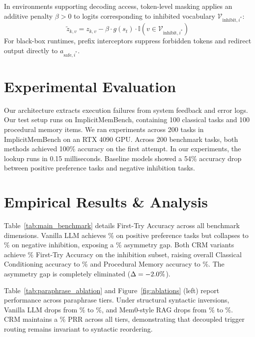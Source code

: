 \documentclass[10pt,conference]{IEEEtran}
\begin{document}
In environments supporting decoding access, token-level masking applies an additive penalty $\beta > 0$ to logits corresponding to inhibited vocabulary $\mathcal{V}_{\text{inhibit}, i^*}$:
\begin{equation}
    \tilde{z}_{k, v} = z_{k, v} - \beta \cdot g(s_t) \cdot \mathbb{I}\left(v \in \mathcal{V}_{\text{inhibit}, i^*}\right)
\end{equation}
For black-box runtimes, prefix interceptors suppress forbidden tokens and redirect output directly to $a_{\text{safe}, i^*}$.



\section{Experimental Evaluation}

Our architecture extracts execution failures from system feedback and error logs. Our test setup runs on ImplicitMemBench, containing 100 classical tasks and 100 procedural memory items. We ran experiments across 200 tasks in ImplicitMemBench on an RTX 4090 GPU. Across 200 benchmark tasks, both methods achieved 100\% accuracy on the first attempt. In our experiments, the lookup runs in 0.15 milliseconds. Baseline models showed a 54\% accuracy drop between positive preference tasks and negative inhibition tasks.



\section{Empirical Results \& Analysis}

Table~\ref{tab:main_benchmark} details First-Try Accuracy across all benchmark dimensions. Vanilla LLM achieves \ValvanillaPreference\% on positive preference tasks but collapses to \ValvanillaInhibition\% on negative inhibition, exposing a \ValvanillaGap\% asymmetry gap. Both CRM variants achieve \ValcrmpromptInhibition\% First-Try Accuracy on the inhibition subset, raising overall Classical Conditioning accuracy to \ValcrmpromptClassical\% and Procedural Memory accuracy to \ValcrmpromptProcedural\%. The asymmetry gap is completely eliminated ($\Delta = -2.0\%$).



Table~\ref{tab:paraphrase_ablation} and Figure~\ref{fig:ablations} (left) report performance across paraphrase tiers. Under structural syntactic inversions, Vanilla LLM drops from \ValParavanillaExact\% to \ValParavanillaStructural\%, and Mem0-style RAG drops from \ValParamemZeroragExact\% to \ValParamemZeroragStructural\%. CRM maintains a \ValParacrmpromptPRR\% PRR across all tiers, demonstrating that decoupled trigger routing remains invariant to syntactic reordering.
\end{document}
